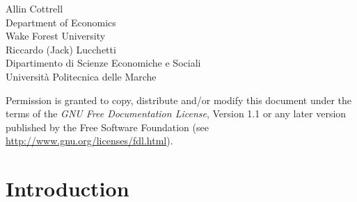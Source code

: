 \documentclass[oneside]{book}
\begin{document}
\VerbatimFootnotes

\setlength{\parindent}{0pt}
\setlength{\parskip}{1ex}
\setcounter{tocdepth}{1}


\thispagestyle{empty}

\begin{center}


{\large \sffamily
Allin Cottrell\\
Department of Economics\\
Wake Forest University\\

\vspace{20pt}
Riccardo (Jack) Lucchetti\\
Dipartimento di Scienze Economiche e Sociali\\
Università Politecnica delle Marche\\

\vspace{20pt}

}

\end{center}
\clearpage


\thispagestyle{empty}


\vspace*{2in}

Permission is granted to copy, distribute and/or modify this document
under the terms of the \emph{GNU Free Documentation License}, Version
1.1 or any later version published by the Free Software Foundation
(see \url{http://www.gnu.org/licenses/fdl.html}).

\cleardoublepage


\pagestyle{headings}

\tableofcontents

\clearpage
{}

\chapter{Introduction}
\label{chap:intro}
\end{document}
